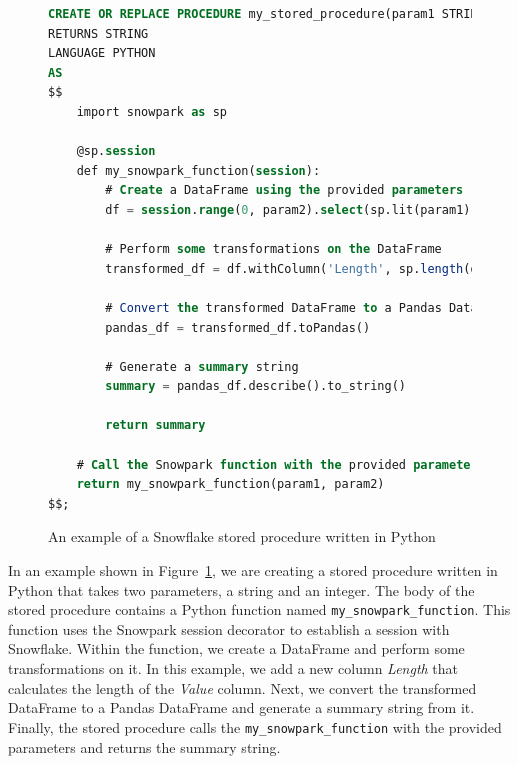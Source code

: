 \begin{figure}[ht]
\begin{lstlisting}[language=SQL]
CREATE OR REPLACE PROCEDURE my_stored_procedure(param1 STRING, param2 INT)
RETURNS STRING
LANGUAGE PYTHON
AS
$$
    import snowpark as sp

    @sp.session
    def my_snowpark_function(session):
        # Create a DataFrame using the provided parameters
        df = session.range(0, param2).select(sp.lit(param1).alias('Value'))
        
        # Perform some transformations on the DataFrame
        transformed_df = df.withColumn('Length', sp.length(df['Value']))
        
        # Convert the transformed DataFrame to a Pandas DataFrame
        pandas_df = transformed_df.toPandas()
        
        # Generate a summary string
        summary = pandas_df.describe().to_string()
        
        return summary
    
    # Call the Snowpark function with the provided parameters
    return my_snowpark_function(param1, param2)
$$;
\end{lstlisting}
\caption{An example of a Snowflake stored procedure written in Python}
\label{fig:snowflakeScript}
\end{figure}

\par
In an example shown in Figure~\ref{fig:snowflakeScript}, we are creating a stored procedure written in Python that takes two parameters, a string and an integer. The body of the stored procedure contains a Python function named \texttt{my\_snowpark\_function}. This function uses the Snowpark session decorator to establish a session with Snowflake. Within the function, we create a DataFrame and perform some transformations on it. In this example, we add a new column \textit{Length} that calculates the length of the \textit{Value} column. Next, we convert the transformed DataFrame to a Pandas DataFrame and generate a summary string from it. Finally, the stored procedure calls the \texttt{my\_snowpark\_function} with the provided parameters and returns the summary string.

